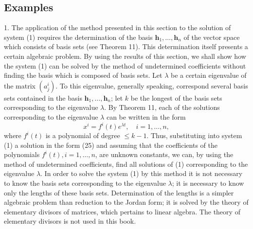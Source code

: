 \documentclass[10pt,a5paper]{book}
\theoremstyle{plain}
\theoremstyle{definition}
\theoremstyle{remark}
\begin{document}
\subsection*{Examples}
1. The application of the method presented in this section to the solution of system (1) requires the determination of the basis $\mathbf{h}_{1}, \ldots, \mathbf{h}_{n}$ of the vector space which consists of basis sets (see Theorem 11). This determination itself presents a certain algebraic problem. By using the results of this section, we shall show how the system (1) can be solved by the method of undetermined coefficients without finding the basis which is composed of basis sets. Let $\lambda$ be a certain eigenvalue of the matrix $\left(a_{j}^{i}\right)$. To this eigenvalue, generally speaking, correspond several basis sets contained in the basis $\mathbf{h}_{1}, \ldots, \mathbf{h}_{n}$; let $k$ be the longest of the basis sets corresponding to the eigenvalue $\lambda$. By Theorem 11, each of the solutions corresponding to the eigenvalue $\lambda$ can be written in the form
\begin{equation*}
x^{i}=f^{i}(t) e^{\lambda t}, \quad i=1, \ldots, n, \tag{25}
\end{equation*}
where $f^{i}(t)$ is a polynomial of degree $\leq k-1$. Thus, substituting into system (1) a solution in the form (25) and assuming that the coefficients of the polynomials $f^{i}(t), i=1, \ldots, n$, are unknown constants, we can, by using the method of undetermined coefficients, find all solutions of (1) corresponding to the eigenvalue $\lambda$. In order to solve the system (1) by this method it is not necessary to know the basis sets corresponding to the eigenvalue $\lambda$; it is necessary to know only the lengths of these basis sets. Determination of the lengths is a simpler algebraic problem than reduction to the Jordan form; it is solved by the theory of elementary divisors of matrices, which pertains to linear algebra. The theory of elementary divisors is not used in this book.
\end{document}
